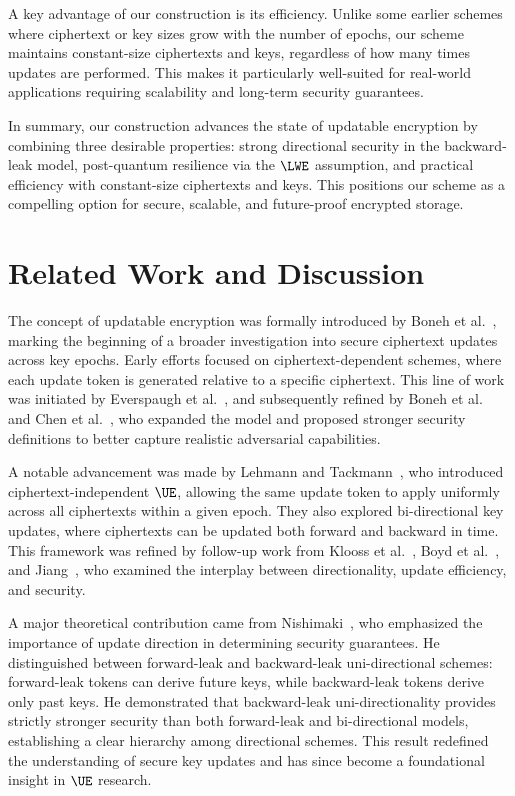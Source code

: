 \documentclass{fundam}
\begin{document}
A key advantage of our construction is its efficiency. Unlike some earlier schemes where ciphertext or key sizes grow with the number of epochs, our scheme maintains constant-size ciphertexts and keys, regardless of how many times updates are performed. This makes it particularly well-suited for real-world applications requiring scalability and long-term security guarantees.

In summary, our construction advances the state of updatable encryption by combining three desirable properties: strong directional security in the backward-leak model, post-quantum resilience via the $\LWE$ assumption, and practical efficiency with constant-size ciphertexts and keys. This positions our scheme as a compelling option for secure, scalable, and future-proof encrypted storage.




\section{Related Work and Discussion}

The concept of updatable encryption was formally introduced by Boneh et al.~\cite{boneh2013key}, marking the beginning of a broader investigation into secure ciphertext updates across key epochs. Early efforts focused on ciphertext-dependent schemes, where each update token is generated relative to a specific ciphertext. This line of work was initiated by Everspaugh et al.~\cite{EPRS17}, and subsequently refined by Boneh et al.~\cite{BEKS20} and Chen et al.~\cite{CLT20}, who expanded the model and proposed stronger security definitions to better capture realistic adversarial capabilities.

A notable advancement was made by Lehmann and Tackmann~\cite{LT18}, who introduced ciphertext-independent $\UE$, allowing the same update token to apply uniformly across all ciphertexts within a given epoch. They also explored bi-directional key updates, where ciphertexts can be updated both forward and backward in time. This framework was refined by follow-up work from Klooss et al.~\cite{klooss2019r}, Boyd et al.~\cite{BDGJ20}, and Jiang~\cite{jiang2020}, who examined the interplay between directionality, update efficiency, and security.

A major theoretical contribution came from Nishimaki~\cite{nishimaki2022direction}, who emphasized the importance of update direction in determining security guarantees. He distinguished between forward-leak and backward-leak uni-directional schemes: forward-leak tokens can derive future keys, while backward-leak tokens derive only past keys. He demonstrated that backward-leak uni-directionality provides strictly stronger security than both forward-leak and bi-directional models, establishing a clear hierarchy among directional schemes. This result redefined the understanding of secure key updates and has since become a foundational insight in $\UE$ research.
\end{document}
